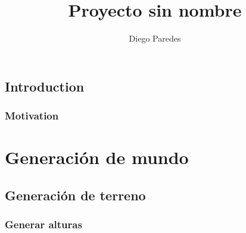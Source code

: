 \documentclass[12pt]{report}
\begin{document}
\title{Proyecto sin nombre}
\author{Diego Paredes}
\maketitle

\tableofcontents

\chapter{Introduction}


\section{Motivation}

\part{Generación de mundo}

\chapter{Generación de terreno}
\section{Generar alturas}
\end{document}
